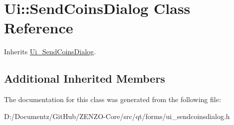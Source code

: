 \hypertarget{class_ui_1_1_send_coins_dialog}{}\section{Ui\+::Send\+Coins\+Dialog Class Reference}
\label{class_ui_1_1_send_coins_dialog}


Inherits \mbox{\hyperlink{class_ui___send_coins_dialog}{Ui\+\_\+\+Send\+Coins\+Dialog}}.

\subsection*{Additional Inherited Members}


The documentation for this class was generated from the following file\+:\begin{DoxyCompactItemize}
\item 
D\+:/\+Documentz/\+Git\+Hub/\+Z\+E\+N\+Z\+O-\/\+Core/src/qt/forms/ui\+\_\+sendcoinsdialog.\+h\end{DoxyCompactItemize}
